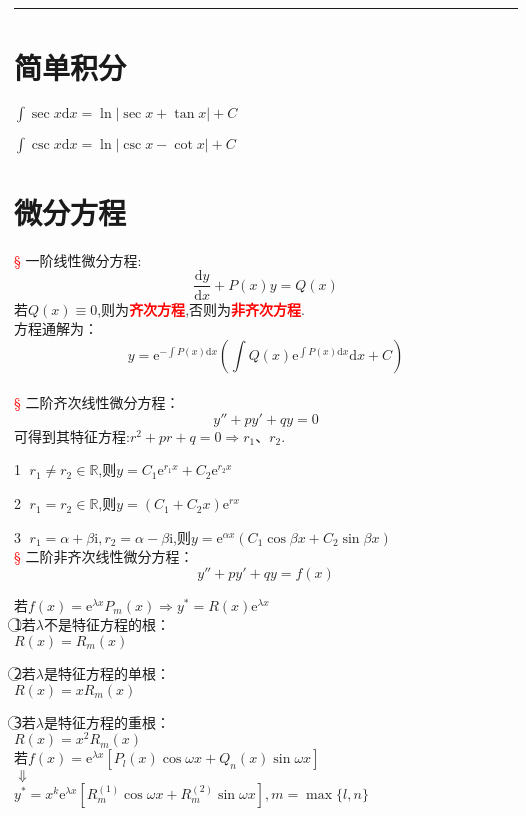 \documentclass{article}
\begin{document}
	\noindent \heiti{}\songti\\ \hrule\bf{}
	\section{简单积分}
	$\int \sec x\mathrm{d}x=\ln |\sec x+\tan x|+C$
	
	$\int \csc x\mathrm{d}x=\ln |\csc x-\cot x|+C$
	\section{微分方程}
	\noindent\textcolor{red}{\S} 一阶线性微分方程:
	\[
		\frac{\mathrm{d}y}{\mathrm{d}x}+P(x)y=Q(x)
	\]
	若$Q(x)\equiv 0$,则为\textcolor{red}{\bf{齐次方程}},否则为\textcolor{red}{\bf{非齐次方程}}.
	\\方程通解为：
	\[
		y=\mathrm{e}^{-\int P(x)\mathrm{d}x} (\int Q(x)\mathrm{e}^{\int P(x)\mathrm{d}x}\mathrm{d}x+C)	
	\]
	\\[0.5cm]
	\noindent\textcolor{red}{\S} 二阶齐次线性微分方程：
	\[
		y''+py'+qy=0	
	\]
	可得到其特征方程:$r^2+pr+q=0\Rightarrow r_1$、$r_2$.
	
	\textcircled{1} $r_1\neq r_2\in\mathbb{R}$,则$y=C_1\mathrm{e}^{r_1x}+C_2\mathrm{e}^{r_2x}$
	
	\textcircled{2} $r_1= r_2\in\mathbb{R}$,则$y=(C_1+C_2x)\mathrm{e}^{rx}$
	
	\textcircled{3} $r_1=\alpha+\beta\mathrm{i},r_2=\alpha-\beta\mathrm{i}$,则$y=\mathrm{e}^{\alpha x}(C_1\cos\beta x+C_2\sin\beta x)$
	\\[1cm]
	\noindent\textcolor{red}{\S} 二阶非齐次线性微分方程：
	\[
		y''+py'+qy=f(x)
	\]
	
	\noindent<1>若$f(x)=\mathrm{e}^{\lambda x}P_m(x)\Rightarrow y^*=R(x)\mathrm{e}^{\lambda x}$
	\\
	
	\textcircled{1}若$\lambda$不是特征方程的根：\\
	\phantom{aaaaaaaaaaaaaaaaaaaaaa}$R(x)=R_m(x)$
	
	\textcircled{2}若$\lambda$是特征方程的单根：\\
	\phantom{aaaaaaaaaaaaaaaaaaaaaa}$R(x)=xR_m(x)$
	
	\textcircled{3}若$\lambda$是特征方程的重根：\\
	\phantom{aaaaaaaaaaaaaaaaaaaaaa}$R(x)=x^2R_m(x)$
	\\[1cm]
	\noindent<2>若$f(x)=\mathrm{e}^{\lambda x}[P_l(x)\cos\omega x+Q_n(x)\sin\omega x]$\\
	\phantom{aaaaaaaaaaaaaa}$\Downarrow$\\
	\phantom{aaaaaaaaa}$y^*=x^k\mathrm{e}^{\lambda x}[R_m^{(1)}\cos\omega x+R_m^{(2)}\sin\omega x],m=\max\{l,n\}$
	
\end{document}

